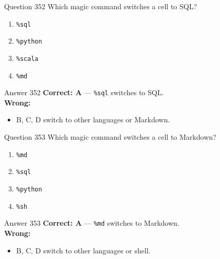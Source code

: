 \documentclass[aspectratio=169,11pt]{beamer}
\begin{document}
	\begin{frame}{Question 352}
		Which magic command switches a cell to SQL?
		\begin{enumerate}[label=\Alph*.]
			\item \texttt{\%sql}
			\item \texttt{\%python}
			\item \texttt{\%scala}
			\item \texttt{\%md}
		\end{enumerate}
	\end{frame}
	\begin{frame}{Answer 352}
		\textbf{Correct: A} --- \texttt{\%sql} switches to SQL.\\
		\vspace{0.5em}
		\textbf{Wrong:}
		\begin{itemize}
			\item B, C, D switch to other languages or Markdown.
		\end{itemize}
	\end{frame}
	
	\begin{frame}{Question 353}
		Which magic command switches a cell to Markdown?
		\begin{enumerate}[label=\Alph*.]
			\item \texttt{\%md}
			\item \texttt{\%sql}
			\item \texttt{\%python}
			\item \texttt{\%sh}
		\end{enumerate}
	\end{frame}
	\begin{frame}{Answer 353}
		\textbf{Correct: A} --- \texttt{\%md} switches to Markdown.\\
		\vspace{0.5em}
		\textbf{Wrong:}
		\begin{itemize}
			\item B, C, D switch to other languages or shell.
		\end{itemize}
	\end{frame}
	
\end{document}
